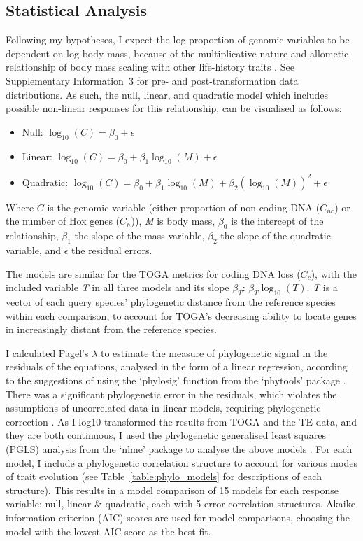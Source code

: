 \documentclass[11pt]{article}
\begin{document}
\subsection{Statistical Analysis}
Following my hypotheses, I expect the log proportion of genomic variables to be dependent on log body mass, because of the multiplicative nature and allometic relationship of body mass scaling with other life-history traits \citep{log-transformation}. See Supplementary Information~3 for pre- and post-transformation data distributions. As such, the null, linear, and quadratic model which includes possible non-linear responses for this relationship, can be visualised as follows:

\begingroup
\begin{itemize}
\setlength\itemsep{-0.1cm}
    \item Null: $\log_{10}(C) = \beta_0 + \epsilon$
    \item Linear: $\log_{10}(C) = \beta_0 + \beta_1 \log_{10}(M) + \epsilon$
    \item Quadratic: $\log_{10}(C) = \beta_0 + \beta_1 \log_{10}(M) + \beta_2 \left(\log_{10}(M)\right)^2 + \epsilon$
\end{itemize}
\endgroup

\noindent Where $C$ is the genomic variable (either proportion of non-coding DNA ($C_{nc}$) or the number of Hox genes ($C_h$)), \textit{M} is body mass, $\beta_0$ is the intercept of the relationship, $\beta_1$ the slope of the mass variable, $\beta_2$ the slope of the quadratic variable, and $\epsilon$ the residual errors. 

The models are similar for the TOGA metrics for coding DNA loss ($C_c$), with the included variable \textit{T} in all three models and its slope $\beta_T$: $\beta_T\log_{10}(T)$. \textit{T} is a vector of each query species' phylogenetic distance from the reference species within each comparison, to account for TOGA's decreasing ability to locate genes in increasingly distant from the reference species.

I calculated Pagel's $\lambda$ to estimate the measure of phylogenetic signal in the residuals of the equations, analysed in the form of a linear regression, according to the suggestions of using the `phylosig' function from the `phytools' package \citep{phytools}. There was a significant phylogenetic error in the residuals, which violates the assumptions of uncorrelated data in linear models, requiring phylogenetic correction \citep{revell2010, statisticalneed}. As I log10-transformed the results from TOGA and the TE data, and they are both continuous, I used the phylogenetic generalised least squares (PGLS) analysis from the `nlme' package to analyse the above models \citep{nlme}. For each model, I include a phylogenetic correlation structure to account for various modes of trait evolution (see Table~\ref{table:phylo_models} for descriptions of each structure). This results in a model comparison of 15 models for each response variable: null, linear \& quadratic, each with 5 error correlation structures. Akaike information criterion (AIC) scores are used for model comparisons, choosing the model with the lowest AIC score as the best fit. 
\end{document}
